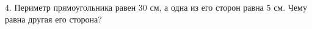 4. Периметр прямоугольника равен 30 см, а одна из его сторон равна 5 см. Чему равна другая его сторона?\\
